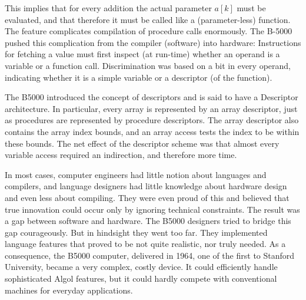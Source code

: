 This implies that for every addition the actual parameter $a[k]$ must be evaluated,
and that therefore it must be called like a (parameter-less) function. The feature
complicates compilation of procedure calls enormously. The B-5000 pushed this
complication from the compiler (software) into hardware: Instructions for fetching a
value must first inspect (at run-time) whether an operand is a variable or a function
call. Discrimination was based on a bit in every operand, indicating whether it is a
simple variable or a descriptor (of the function).

The B5000 introduced the concept of descriptors and is said to have a Descriptor
architecture. In particular, every array is represented by an array descriptor, just as
procedures are represented by procedure descriptors. The array descriptor also
contains the array index bounds, and an array access tests the index to be within
these bounds. The net effect of the descriptor scheme was that almost every
variable access required an indirection, and therefore more time.

In most cases, computer engineers had little notion about languages and
compilers, and language designers had little knowledge about hardware design
and even less about compiling. They were even proud of this and believed that
true innovation could occur only by ignoring technical constraints. The result was a
gap between software and hardware. The B5000 designers tried to bridge this gap
courageously. But in hindsight they went too far. They implemented language
features that proved to be not quite realistic, nor truly needed. As a consequence,
the B5000 computer, delivered in 1964, one of the first to Stanford University,
became a very complex, costly device. It could efficiently handle sophisticated
Algol features, but it could hardly compete with conventional machines for
everyday applications.
